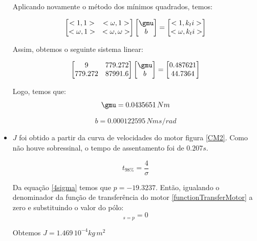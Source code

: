 \documentclass[]{politex}
\begin{document}
\begin{itemize}
Aplicando novamente o método dos mínimos quadrados, temos:

\begin{equation}
\begin{bmatrix}
<1, 1> & <\omega, 1>\\
<\omega, 1> & <\omega, \omega>
\end{bmatrix}
\begin{bmatrix}
\gmu\\
b
\end{bmatrix}= 
\begin{bmatrix}
<1, k_{t} i >\\
<\omega, k_{t} i >
\end{bmatrix}
\end{equation}

Assim, obtemos o seguinte sistema linear:

\begin{equation}
\begin{bmatrix}
9 & 779.272\\
779.272 & 87991.6
\end{bmatrix}
\begin{bmatrix}
\gmu\\
b
\end{bmatrix}= 
\begin{bmatrix}
0.487621\\
44.7364
\end{bmatrix}
\end{equation}

Logo, temos que: 
\begin{equation}
\gmu = 0.0435651 \, Nm
\end{equation}

\begin{equation}
b = 0.000122595 \, Nm s/rad
\end{equation}

\item $J$ foi obtido a partir da curva de velocidades do motor figura \ref{CM2}. Como não houve sobressinal, o tempo de assentamento foi de $0.207 s$.

\begin{equation}
\label{4sigma}
 t_{98\%} =\frac{4}{\sigma}
\end{equation}

Da equação \eqref{4sigma} temos que $p= -19.3237$.
Então, igualando o denominador da função de transferência do motor \eqref{functionTransferMotor}  a zero e substituindo o valor do pólo:
\begin{equation}
[(L s + R) (J s + b) + k_t k_e]_{s = p} = 0
\end{equation}

Obtemos $J = 1.469 \, 10^{-4} kg \, m^2 $

\end{itemize}
\end{document}
